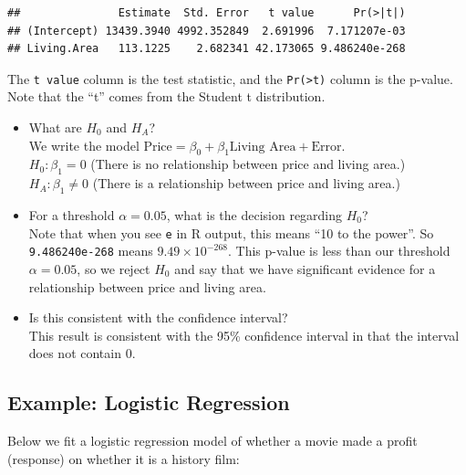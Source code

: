 \documentclass[]{book}
\newenvironment{Shaded}{\begin{snugshade}}{\end{snugshade}}
\newcommand{\CommentTok}[1]{\textcolor[rgb]{0.56,0.35,0.01}{\textit{#1}}}
\newcommand{\DataTypeTok}[1]{\textcolor[rgb]{0.13,0.29,0.53}{#1}}
\newcommand{\KeywordTok}[1]{\textcolor[rgb]{0.13,0.29,0.53}{\textbf{#1}}}
\newcommand{\NormalTok}[1]{#1}
\newcommand{\OperatorTok}[1]{\textcolor[rgb]{0.81,0.36,0.00}{\textbf{#1}}}
\newcommand{\OtherTok}[1]{\textcolor[rgb]{0.56,0.35,0.01}{#1}}
\newcommand{\StringTok}[1]{\textcolor[rgb]{0.31,0.60,0.02}{#1}}
\providecommand{\tightlist}{%
  \setlength{\itemsep}{0pt}\setlength{\parskip}{0pt}}
\begin{document}
\begin{verbatim}
##               Estimate  Std. Error   t value      Pr(>|t|)
## (Intercept) 13439.3940 4992.352849  2.691996  7.171207e-03
## Living.Area   113.1225    2.682341 42.173065 9.486240e-268
\end{verbatim}

The \texttt{t\ value} column is the test statistic, and the \texttt{Pr(\textgreater{}\textbar{}t\textbar{})} column is the p-value. Note that the ``t'' comes from the Student t distribution.

\begin{itemize}
\tightlist
\item
  What are \(H_0\) and \(H_A\)?\\
  We write the model \(\text{Price} = \beta_0 + \beta_1\text{Living Area} + \text{Error}\).\\
  \(H_0: \beta_1 = 0\) (There is no relationship between price and living area.)\\
  \(H_A: \beta_1 \neq 0\) (There is a relationship between price and living area.)\\
\item
  For a threshold \(\alpha = 0.05\), what is the decision regarding \(H_0\)?\\
  Note that when you see \texttt{e} in R output, this means ``10 to the power''. So \texttt{9.486240e-268} means \(9.49 \times 10^{-268}\). This p-value is less than our threshold \(\alpha = 0.05\), so we reject \(H_0\) and say that we have significant evidence for a relationship between price and living area.
\item
  Is this consistent with the confidence interval?\\
  This result is consistent with the 95\% confidence interval in that the interval does not contain 0.
\end{itemize}

\hypertarget{example-logistic-regression}{%
\subsection{Example: Logistic Regression}\label{example-logistic-regression}}

Below we fit a logistic regression model of whether a movie made a profit (response) on whether it is a history film:

\begin{Shaded}
\end{Shaded}
\end{document}
